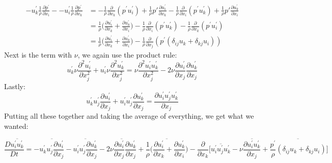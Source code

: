 \documentclass[a4paper,norsk]{article}
\begin{document}
\begin{align*}
- u_k^{'}\frac{1}{\rho}\frac{\partial p^{'}} {\partial x_i} - - u_i^{'}\frac{1}{\rho}\frac{\partial p^{'}} {\partial x_k} &=  -\frac{1}{\rho}\frac{\partial}{\partial x_k} (p^{'} u_i^{'}) +  \frac{1}{\rho}p{'} \frac{\partial u_i^{'} }{\partial x_k} - \frac{1}{\rho}\frac{\partial}{\partial x_i} (p^{'} u_k^{'}) + \frac{1}{\rho}p{'} \frac{\partial u_k^{'} }{\partial x_i} \\
 & =\frac{1}{\rho}\big( \frac{\partial u^{'}_i}{\partial x_k} + \frac{\partial u^{'}_k}{\partial x_i} \big) - \frac{1}{\rho}\frac{\partial}{\partial x_i} (p^{'} u_k^{'}) - \frac{1}{\rho}\frac{\partial}{\partial x_k} (p^{'} u_i^{'}) \\
 &=  \frac{1}{\rho}\big( \frac{\partial u^{'}_i}{\partial x_k} + \frac{\partial u^{'}_k}{\partial x_i} \big) -\frac{1}{\rho} \frac{\partial}{\partial x_j} ( p^{'}( \delta_{ij} u_k + \delta_{kj}u_i    )     )
\end{align*}
Next is the term with $\nu$, we again use the product rule:
\begin{equation*}
u_k^{'}\nu \frac{\partial^2 u^{'}_i} {\partial x_j^2} + u_i^{'}\nu \frac{\partial^2 u^{'}_k} {\partial x_j^2} = \nu \frac{\partial^2 u^{'}_i u^{'}_k}{\partial x_j^2} - 2\nu \frac{\partial u^{'}_i }{\partial x_j} \frac{\partial u^{'}_k }{\partial x_j}
\end{equation*}
Lastly:
\begin{equation*}
u_k^{'}u_j^{'}\frac{\partial u_i^{'}}{\partial x_j} + u_i^{'}u_j^{'}\frac{\partial u_k^{'}}{\partial x_j} = \frac{\partial u_i^{'} u_j^{'} u_k^{'}}{\partial x_j}
\end{equation*}
Putting all these together and taking the average of everything, we get what we wanted:

\begin{equation}
 \frac{D \overline{u_i^{'}u_k^{'}}}{Dt} = -\overline{ u_k^{'}u_j^{'}\frac{\partial u_i^{'}}{\partial x_j}} - \overline{u_i^{'}u_j^{'}\frac{\partial u_k^{'}}{\partial x_j}} -  \overline{2\nu \frac{\partial u^{'}_i }{\partial x_j} \frac{\partial u^{'}_k }{\partial x_j}}
 + \overline{\frac{1}{\rho}\big( \frac{\partial u^{'}_i}{\partial x_k} + \frac{\partial u^{'}_k}{\partial x_i} \big)} - \frac{\partial }{\partial x_k} \big[ \overline{u_i^{'} u_j^{'} u_k^{'}} -  \nu\overline{ \frac{\partial u^{'}_i u^{'}_k}{\partial x_j}} + 
     \overline{\frac{p^{'}}{\rho} ( \delta_{ij} u_k + \delta_{kj}u_i  )} \big]  
\end{equation}
\newline
\newline
\end{document}
